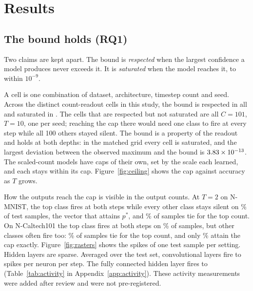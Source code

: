 \documentclass[10pt]{article}
\begin{document}
\section{Results}
\label{sec:results}

\subsection{The bound holds (RQ1)}
\label{sec:holds}

Two claims are kept apart. The bound is \emph{respected} when the largest confidence a model
produces never exceeds it. It is \emph{saturated} when the model reaches it, to within $10^{-9}$. %

A cell is one combination of dataset, architecture, timestep count and seed. Across the
\cellsUnion{} distinct count-readout cells in this study, the bound is respected in all %
\cellsUnion{} and saturated in \cellsSaturated. The \cellsSlack{} cells that are respected but %
not saturated are all $C=101$, $T=10$, one per seed; reaching the cap there would need one class
to fire at every step while all 100 others stayed silent. The bound is a property of the readout
and holds at both depths: in the matched grid every cell is saturated, and the largest deviation
between the observed maximum and the bound is $3.83\times 10^{-13}$. The \scRuns{} scaled-count %
models have caps of their own, set by the scale each learned, and each stays within its cap. %
Figure~\ref{fig:ceiling} shows the cap against accuracy as $T$ grows.

How the outputs reach the cap is visible in the output counts. At $T=2$ on N-MNIST, the top class %
fires at both steps while every other class stays silent on \satNmTwo\% of test samples, the
vector that attains $p^{*}$, and \tieNmTwo\% of samples tie for the top count. On N-Caltech101 the
top class fires at both steps on \topEveryNcTwo\% of samples, but other classes often fire too: %
\tieNcTwo\% of samples tie for the top count, and only \satNcTwo\% attain the cap exactly.
Figure~\ref{fig:rasters} shows the spikes of one test sample per setting. Hidden layers are
sparse. Averaged over the test set, convolutional layers fire \rateConvMin{} to \rateConvMax{} %
spikes per neuron per step. The fully connected hidden layer fires \rateHiddenMin{} to %
\rateHiddenMax{} (Table~\ref{tab:activity} in Appendix~\ref{app:activity}). These activity
measurements were added after review and were not pre-registered.
\end{document}
